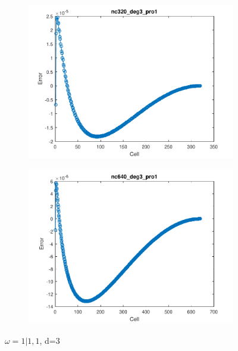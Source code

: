 \documentclass[11pt,a4paper]{article}
\theoremstyle{plain}
\theoremstyle{definition}
\begin{document}
\begin{figure}[H]
\medskip
\begin{subfigure}[b]{0.48\textwidth}
\includegraphics[width=\linewidth]{../../tests_01_01/test_01_01_test48_pro1/output/plots/nc320_deg3_wei111_pro1.pdf}
\end{subfigure}\hspace*{\fill}
\begin{subfigure}[b]{0.48\textwidth}
\includegraphics[width=\linewidth]{../../tests_01_01/test_01_01_test48_pro1/output/plots/nc640_deg3_wei111_pro1.pdf}
\end{subfigure}

\caption{$\omega=1|1,1$, d=3}
\end{figure}
\end{document}
